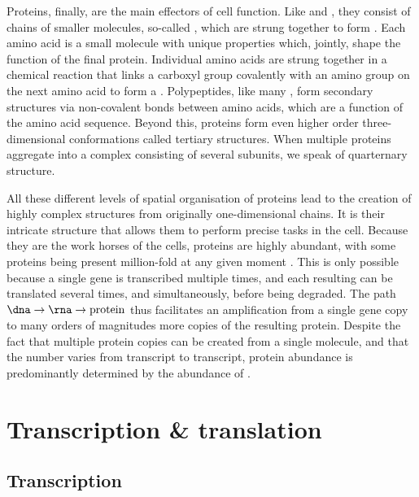 Proteins, finally, are the main effectors of cell function. Like \dna and \rna,
they consist of chains of smaller molecules, so-called
, which are strung together to form
. Each amino acid is a small molecule with unique
properties which, jointly, shape the function of the final protein. Individual
amino acids are strung together in a chemical reaction that links a carboxyl
group covalently with an amino group on the next amino acid to form a
\citep{Alberts:2002}. Polypeptides, like many \rna[s], form secondary structures
via non-covalent bonds between amino acids, which are a function of the amino
acid sequence. Beyond this, proteins form even higher order three-dimensional
conformations called tertiary structures. When multiple proteins aggregate into
a complex consisting of several subunits, we speak of quarternary structure.

All these different levels of spatial organisation of proteins lead to the
creation of highly complex structures from originally one-dimensional chains. It
is their intricate structure that allows them to perform precise tasks in the
cell. Because they are the work horses of the cells, proteins are highly
abundant, with some proteins being present million-fold at any given moment
\citep{Milo:2013}. This is only possible because a single gene is transcribed
multiple times, and each resulting \mrna can be translated several times, and
simultaneously, before being degraded. The path
\(\text{\dna}\rightarrow\text{\rna}\rightarrow\text{protein}\) thus facilitates
an amplification from a single gene copy to many orders of magnitudes more
copies of the resulting protein. Despite the fact that multiple protein copies
can be created from a single \mrna molecule, and that the number varies from
transcript to transcript, protein abundance is predominantly determined by the
abundance of \mrna[s] \citep{Li:2014,Jovanovic:2015,Csardi:2014}.

\section{Transcription \& translation}

\subsection{Transcription}
\label{sec:transcription}

